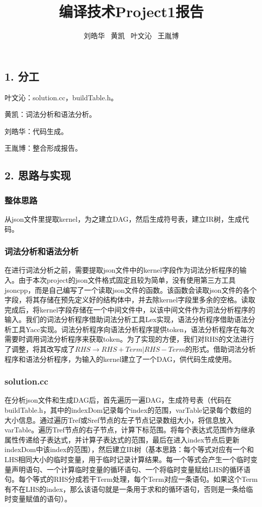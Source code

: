 \documentclass[a4paper,11pt]{ctexart}
\title{编译技术Project1报告}
\author{刘皓华 ~黄凯 ~叶文沁 ~王胤博}
\date{ }
\begin{document}
\maketitle
\subsection*{1. 分工}
叶文沁：solution.cc，buildTable.h。

黄凯：词法分析和语法分析。

刘皓华：代码生成。

王胤博：整合形成报告。
\subsection*{2. 思路与实现}
\subsubsection*{整体思路}

从json文件里提取kernel，为之建立DAG，然后生成符号表，建立IR树，生成代码。

\subsubsection*{词法分析和语法分析}

在进行词法分析之前，需要提取json文件中的kernel字段作为词法分析程序的输入。由于本次project的json文件格式固定且较为简单，没有使用第三方工具jsoncpp，而是自己编写了一个读取json文件的函数。该函数会读取json文件的各个字段，将其存储在预先定义好的结构体中，并去除kernel字段里多余的空格。读取完成后，将kernel字段存储在一个中间文件中，以该中间文件作为词法分析程序的输入。我们的词法分析程序借助词法分析工具Lex实现，语法分析程序借助语法分析工具Yacc实现。词法分析程序向语法分析程序提供token，语法分析程序在每次需要时调用词法分析程序来获取token。为了实现的方便，我们对RHS的文法进行了调整，将其改写成了$RHS\rightarrow RHS+Term|RHS-Term$的形式。借助词法分析程序和语法分析程序，为输入的kernel建立了一个DAG，供代码生成使用。

\subsubsection*{solution.cc}

在分析json文件和生成DAG后，首先遍历一遍DAG，生成符号表（代码在buildTable.h，其中的indexDom记录每个index的范围，varTable记录每个数组的大小信息。通过遍历Tref或Sref节点的左子节点记录数组大小，将信息放入varTable。遍历Tref节点的右子节点，计算下标范围。将每个表达式范围作为继承属性传递给子表达式，并计算子表达式的范围，最后在进入index节点后更新indexDom中该index的范围），然后建立IR树（基本思路：每个等式对应有一个和LHS相同大小的临时变量，用于临时记录计算结果。每一个等式会产生一个临时变量声明语句、一个计算临时变量的循环语句、一个将临时变量赋给LHS的循环语句。每个等式的RHS分成若干Term处理，每个Term对应一条语句。如果这个Term有不在LHS的index，那么该语句就是一条用于求和的循环语句，否则是一条给临时变量赋值的语句）。
\end{document}
